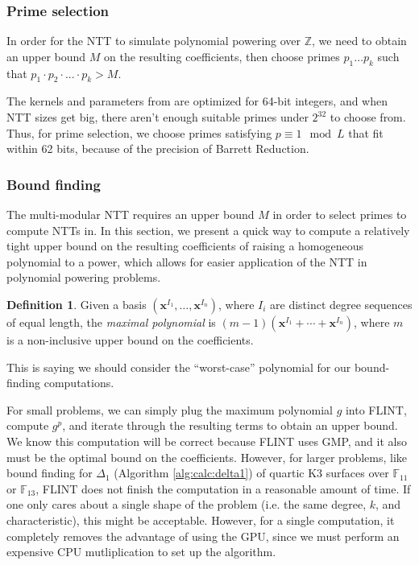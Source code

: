 \documentclass[a4paper]{article}
\theoremstyle{definition}
\newtheorem{defn}[thm]{Definition}
\theoremstyle{remark}
\begin{document}
\subsubsection{Prime selection}
In order for the NTT to simulate polynomial powering over $\mathbb{Z}$, 
we need to obtain an upper bound $M$ 
on the resulting coefficients, then 
choose primes $p_1 \dots p_k$ such 
that $p_1 \cdot p_2 \cdot ... \cdot p_k > M$.

The kernels and parameters from \cite{ozcan-2023-fft} are 
optimized for 64-bit integers, and when NTT sizes get big, there 
aren't enough suitable primes under $2^{32}$ to choose from.
Thus, for prime selection, 
we choose primes satisfying $p \equiv 1 \mod L$ that fit 
within 62 bits, because of the precision of Barrett Reduction.

\subsubsection{Bound finding}
The multi-modular NTT requires an upper bound $M$ in order to select primes 
to compute NTTs in. In this section, we present a quick way to compute a 
relatively tight upper bound on the resulting 
coefficients of raising a homogeneous polynomial to a power, which
allows for easier application of the NTT in polynomial powering
problems.

\begin{defn}
    Given a basis $(\mathbf{x}^{I_1}, \dots, \mathbf{x}^{I_n})$, 
    where $I_i$ are distinct degree sequences of equal 
    length, the \textit{maximal polynomial} is 
    $(m - 1)(\mathbf{x}^{I_1} + \cdots + \mathbf{x}^{I_n})$, 
    where $m$ is a non-inclusive upper bound on the coefficients.
\end{defn}

This is saying we should consider the ``worst-case'' polynomial 
for our bound-finding computations.

For small problems, we can simply plug the maximum 
polynomial $g$ into FLINT, compute $g ^ p$, and 
iterate through the resulting terms to obtain an upper bound.
We know this computation will be correct because FLINT uses GMP,
and it also must be the optimal bound on the coefficients. 
However, for larger problems, like bound finding for 
$\Delta_1$ (Algorithm \ref{alg:calc:delta1}) of
quartic K3 surfaces over $\mathbb{F}_{11}$ or $\mathbb{F}_{13}$, 
FLINT does not finish the computation in a reasonable amount of time.
If one only cares about a single shape of the problem 
(i.e. the same degree, \(k\), and characteristic),
this might be acceptable.
However, for a single computation, it completely removes 
the advantage of using the GPU, since we must perform an 
expensive CPU mutliplication to set up the algorithm.
\end{document}
